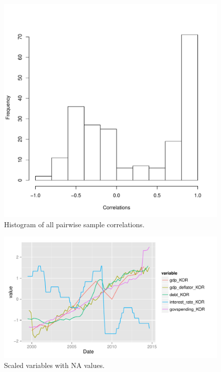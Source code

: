 \documentclass[12pt]{article}
\begin{document}
\begin{figure}
  \centering
    \includegraphics{correlation.pdf}
  \caption{Histogram of all pairwise sample correlations.}
  \label{fig:correlation}
\end{figure}

\begin{figure}
  \centering
    \includegraphics{na_plot_KOR.pdf}
  \caption{Scaled variables with NA values.}
  \label{fig:na_plot_KOR}
\end{figure}
\end{document}
